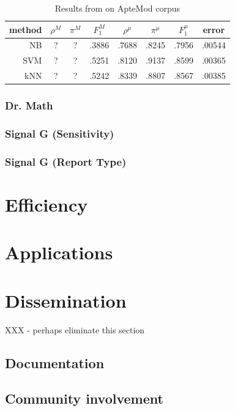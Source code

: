 \begin{table}
\begin{center}
\begin{tabular}{|r c c c c c c c|}
\hline
method & $\rho^M$ & $\pi^M$ & $F_1^M$ & $\rho^\mu$ & $\pi^\mu$ & $F_1^\mu$ & error \\
\hline
NB  & ? & ? & .3886 & .7688 & .8245 & .7956 & .00544 \\
SVM & ? & ? & .5251 & .8120 & .9137 & .8599 & .00365 \\
kNN & ? & ? & .5242 & .8339 & .8807 & .8567 & .00385 \\
\hline
\end{tabular}
\end{center}
\caption{Results from \cite{yang:99} on ApteMod corpus}
\end{table}


\subsubsection{Dr. Math}
\subsubsection{Signal G (Sensitivity)}
\subsubsection{Signal G (Report Type)}

\section{Efficiency}
\label{Efficiency}

\section{Applications}
\label{Applications}

\section{Dissemination}
XXX - perhaps eliminate this section

\subsection{Documentation}
\subsection{Community involvement}
